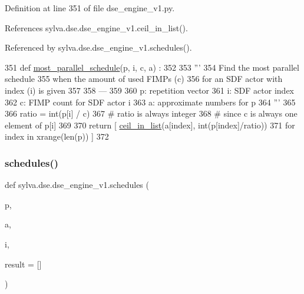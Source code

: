 Definition at line 351 of file dse\+\_\+engine\+\_\+v1.\+py.



References sylva.\+dse.\+dse\+\_\+engine\+\_\+v1.\+ceil\+\_\+in\+\_\+list().



Referenced by sylva.\+dse.\+dse\+\_\+engine\+\_\+v1.\+schedules().


\begin{DoxyCode}
351 \textcolor{keyword}{def }\hyperlink{namespacesylva_1_1dse_1_1dse__engine__v1_a2c16f997588f8721ab7742ca16e79e64}{most\_parallel\_schedule}(p, i, c, a) :
352 
353   \textcolor{stringliteral}{'''}
354 \textcolor{stringliteral}{    Find the most parallel schedule}
355 \textcolor{stringliteral}{    when the amount of used FIMPs (c)}
356 \textcolor{stringliteral}{    for an SDF actor with index (i) is given}
357 \textcolor{stringliteral}{}
358 \textcolor{stringliteral}{    ---}
359 \textcolor{stringliteral}{}
360 \textcolor{stringliteral}{    p: repetition vector}
361 \textcolor{stringliteral}{    i: SDF actor index}
362 \textcolor{stringliteral}{    c: FIMP count for SDF actor i}
363 \textcolor{stringliteral}{    a: approximate numbers for p}
364 \textcolor{stringliteral}{  '''}
365 
366   ratio = int(p[i] / c)
367   \textcolor{comment}{# ratio is always integer}
368   \textcolor{comment}{# since c is always one element of p[i]}
369 
370   \textcolor{keywordflow}{return} [ \hyperlink{namespacesylva_1_1dse_1_1dse__engine__v1_af190117e4402a059bd348c6909abada2}{ceil\_in\_list}(a[index], int(p[index]/ratio))
371            \textcolor{keywordflow}{for} index \textcolor{keywordflow}{in} xrange(len(p)) ]
372 
\end{DoxyCode}
\mbox{\label{namespacesylva_1_1dse_1_1dse__engine__v1_a9f62832c5ef72269c1920b61d0eeb2a6}} 
\subsubsection{\texorpdfstring{schedules()}{schedules()}}
{\footnotesize\ttfamily def sylva.\+dse.\+dse\+\_\+engine\+\_\+v1.\+schedules (\begin{DoxyParamCaption}\item[{}]{p,  }\item[{}]{a,  }\item[{}]{i,  }\item[{}]{result = {\ttfamily \mbox{[}\mbox{]}} }\end{DoxyParamCaption})}



